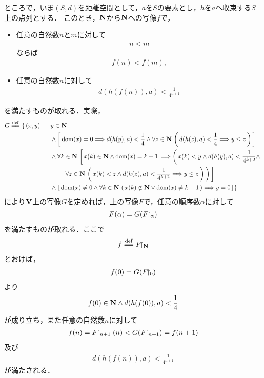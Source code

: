 	ところで，いま$(S,d)$を距離空間として，$a$を$S$の要素とし，$h$を$a$へ収束する$S$上の点列とする．
	このとき，$\mathbf{N}$から$\mathbf{N}$への写像$f$で，
	\begin{itemize}
		\item 任意の自然数$n$と$m$に対して
			\begin{align}
				n < m
			\end{align}
			ならば
			\begin{align}
				f(n) < f(m),
			\end{align}
			
		\item 任意の自然数$n$に対して
			\begin{align}
				d(h(f(n)),a) < \frac{1}{4^{n+1}}
			\end{align}
	\end{itemize}
	を満たすものが取れる．実際，
	\begin{align}
		G \defeq \left\{\, (x,y) \mid \quad \right. &y \in \Natural \\
		&\wedge \left[\, \dom{x} = 0 \Longrightarrow d(h(y),a) < \frac{1}{4} \wedge \forall z \in \Natural\, \left(\, d(h(z),a) < \frac{1}{4}
		\Longrightarrow y \leq z\, \right)\, \right] \\
		&\wedge \forall k \in \Natural\, \left[\, x(k) \in \Natural \wedge \dom{x} = k+1\, \Longrightarrow 
		\left(\, x(k) < y \wedge d(h(y),a) < \frac{1}{4^{k+2}} \wedge \right. \right. \\
		&\left.\left. \quad\quad \forall z \in \Natural\, 
		\left(\, x(k) < z \wedge d(h(z),a) < \frac{1}{4^{k+2}} \Longrightarrow y \leq z\, \right)\, \right)\, \right] \\
		&\wedge \left. \left[\, \dom{x} \neq 0 \wedge \forall k \in \Natural\, \left(\, x(k) \notin \Natural \vee \dom{x} \neq k+1\, \right)
		\Longrightarrow y = 0\, \right]\, \right\}
	\end{align}
	により$\mathbf{V}$上の写像$G$を定めれば，上の写像$F$で，任意の順序数$\alpha$に対して
	\begin{align}
		F(\alpha) = G(F\hspace{-0.41em}\upharpoonright_{\alpha})
	\end{align}
	を満たすものが取れる．ここで
	\begin{align}
		f \defeq \rest{F}{\Natural}
	\end{align}
	とおけば，
	\begin{align}
		f(0) = G(F\hspace{-0.41em}\upharpoonright_{0})
	\end{align}
	より
	\begin{align}
		f(0) \in \mathbf{N} \wedge d(h(f(0)),a) < \frac{1}{4}
	\end{align}
	が成り立ち，また任意の自然数$n$に対して
	\begin{align}
		f(n) = F\hspace{-0.41em}\upharpoonright_{n+1}(n) < G(F\hspace{-0.41em}\upharpoonright_{n+1}) = f(n+1)
	\end{align}
	及び
	\begin{align}
		d(h(f(n)),a) < \frac{1}{4^{n+1}}
	\end{align}
	が満たされる．
	
